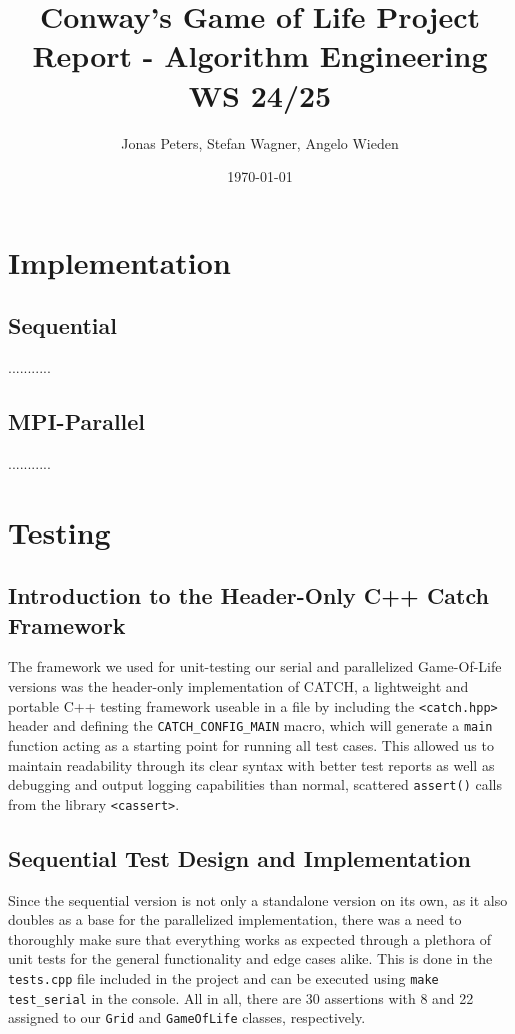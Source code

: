 \documentclass[11pt]{article}
\title{Conway's Game of Life Project Report - Algorithm Engineering WS 24/25}
\author{Jonas Peters, Stefan Wagner, Angelo Wieden}
\date{\today}
\begin{document}
\maketitle

\tableofcontents

\section{Implementation}

\subsection{Sequential}
...........

\subsection{MPI-Parallel}
...........

\section{Testing}

\subsection{Introduction to the Header-Only C++ Catch Framework}
The framework we used for unit-testing our serial and parallelized Game-Of-Life versions was the header-only implementation of CATCH, a lightweight and portable C++ testing framework useable in a file by including the \texttt{<catch.hpp>} header and defining the \texttt{CATCH\_CONFIG\_MAIN} macro, which will generate a \texttt{main} function acting as a starting point for running all test cases. This allowed us to maintain readability through its clear syntax with better test reports as well as debugging and output logging capabilities than normal, scattered \texttt{assert()} calls from the library \texttt{<cassert>}.

\subsection{Sequential Test Design and Implementation}
Since the sequential version is not only a standalone version on its own, as it also doubles as a base for the parallelized implementation, there was a need to thoroughly make sure that everything works as expected through a plethora of unit tests for the general functionality and edge cases alike. This is done in the \texttt{tests.cpp} file included in the project and can be executed using \texttt{make test\_serial} in the console. All in all, there are 30 assertions with 8 and 22 assigned to our \texttt{Grid} and \texttt{GameOfLife} classes, respectively.
\end{document}
